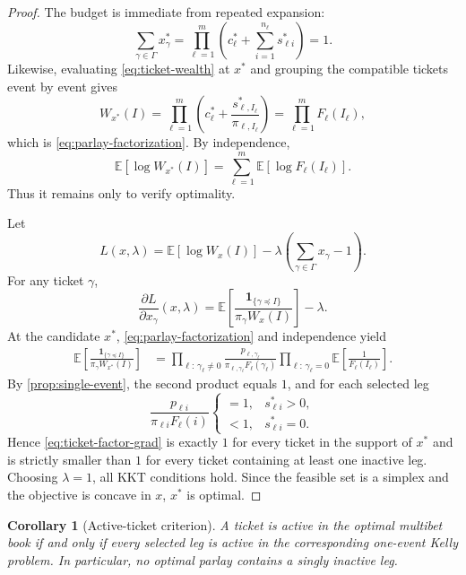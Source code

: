 \documentclass[11pt]{article}
\numberwithin{equation}{section}
\newtheorem{corollary}[theorem]{Corollary}
\theoremstyle{remark}
\theoremstyle{definition}
\newcommand{\E}{\mathbb{E}}
\newcommand{\1}{\mathbf{1}}
\begin{document}
\begin{proof}
The budget is immediate from repeated expansion:
\[
  \sum_{\gamma\in\Gamma} x_\gamma^*
  = \prod_{\ell=1}^m \left(c_\ell^*+\sum_{i=1}^{n_\ell} s_{\ell i}^*\right)=1.
\]
Likewise, evaluating \eqref{eq:ticket-wealth} at $x^*$ and grouping the compatible tickets event by event gives
\[
  W_{x^*}(I)
  =\prod_{\ell=1}^m\left(c_\ell^*+\frac{s_{\ell,I_\ell}^*}{\pi_{\ell,I_\ell}}\right)
  =\prod_{\ell=1}^m F_\ell(I_\ell),
\]
which is \eqref{eq:parlay-factorization}. By independence,
\[
  \E[\log W_{x^*}(I)]
  =\sum_{\ell=1}^m \E[\log F_\ell(I_\ell)].
\]
Thus it remains only to verify optimality.

Let
\[
  L(x,\lambda)=\E[\log W_x(I)]-\lambda\left(\sum_{\gamma\in\Gamma}x_\gamma-1\right).
\]
For any ticket $\gamma$,
\begin{equation}
  \frac{\partial L}{\partial x_\gamma}(x,\lambda)
  =\E\!\left[\frac{\1_{\{\gamma\preceq I\}}}{\pi_\gamma W_x(I)}\right]-\lambda.
  \label{eq:ticket-gradient}
\end{equation}
At the candidate $x^*$, \eqref{eq:parlay-factorization} and independence yield
\begin{align}
  \E\!\left[\frac{\1_{\{\gamma\preceq I\}}}{\pi_\gamma W_{x^*}(I)}\right]
   &= \prod_{\ell:\,\gamma_\ell\neq 0}
      \frac{p_{\ell,\gamma_\ell}}{\pi_{\ell,\gamma_\ell}F_\ell(\gamma_\ell)}
      \prod_{\ell:\,\gamma_\ell=0}
      \E\!\left[\frac{1}{F_\ell(I_\ell)}\right].
      \label{eq:ticket-factor-grad}
\end{align}
By \cref{prop:single-event}, the second product equals $1$, and for each selected leg
\[
  \frac{p_{\ell i}}{\pi_{\ell i}F_\ell(i)}
  \begin{cases}
    =1,& s_{\ell i}^*>0,\\
    <1,& s_{\ell i}^*=0.
  \end{cases}
\]
Hence \eqref{eq:ticket-factor-grad} is exactly $1$ for every ticket in the support of $x^*$ and is strictly smaller than $1$ for every ticket containing at least one inactive leg. Choosing $\lambda=1$, all KKT conditions hold. Since the feasible set is a simplex and the objective is concave in $x$, $x^*$ is optimal.
\end{proof}

\begin{corollary}[Active-ticket criterion]
\label{cor:active-ticket}
A ticket is active in the optimal multibet book if and only if every selected leg is active in the corresponding one-event Kelly problem. In particular, no optimal parlay contains a singly inactive leg.
\end{corollary}
\end{document}
